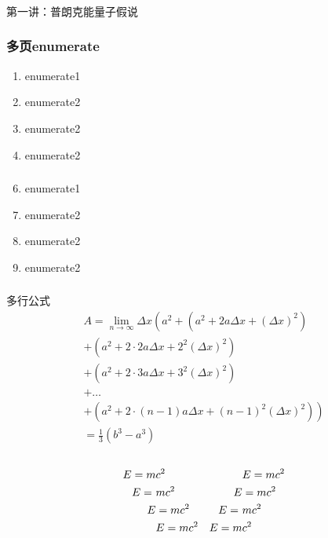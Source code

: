 \begin{frame} [plain]
  \frametitle{}
  \Background[1]
  \begin{center}
  { {\huge 第一讲：普朗克能量子假说 }}
  \end{center}
  \addtocounter{framenumber}{-1}
\end{frame}

\begin{frame}
 \frametitle{多页enumerate}    
    \begin{enumerate}
      \item enumerate1
      \item enumerate2
      \item enumerate2 
      \item enumerate2
    \end{enumerate}
\end{frame}

\begin{frame}
  \frametitle{}    
     \begin{enumerate}
      \setcounter{enumi}{5}
       \item enumerate1
       \item enumerate2
       \item enumerate2 
       \item enumerate2
     \end{enumerate}
 \end{frame}


\begin{frame}
    \frametitle{}
    多行公式
    \begin{multline}
            A=\lim_{n\rightarrow\infty}\Delta x\left(a^{2}+\left(a^{2}+2a\Delta x+\left(\Delta x\right)^{2}\right)\right.\label{eq:reset}\\
            +\left(a^{2}+2\cdot2a\Delta x+2^{2}\left(\Delta x\right)^{2}\right)\\
            +\left(a^{2}+2\cdot3a\Delta x+3^{2}\left(\Delta x\right)^{2}\right)\\
            +\ldots\\
            \left.+\left(a^{2}+2\cdot(n-1)a\Delta x+(n-1)^{2}\left(\Delta x\right)^{2}\right)\right)\\
            =\frac{1}{3}\left(b^{3}-a^{3}\right)
    \end{multline}\\
    \begin{align}
      E=m&c^2 & &E=mc^2\\
      E=~&mc^2 & E&=mc^2 \notag \\
      E&=mc^2 & E=~&mc^2\\
      &E=mc^2 & E=m&c^2
\end{align}
\end{frame}

